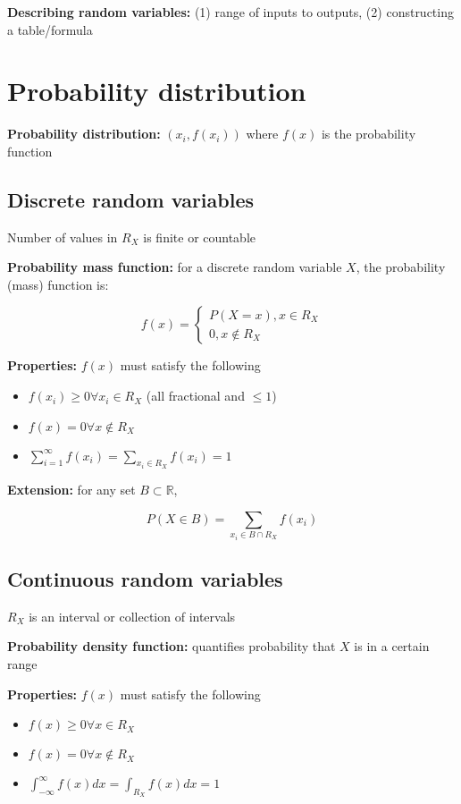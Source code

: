 \documentclass[twocolumn, 8pt]{extarticle}
\begin{document}
\textbf{Describing random variables:} (1) range of inputs to outputs, (2) constructing a table/formula

\section*{Probability distribution}

\textbf{Probability distribution:} $(x_i, f(x_i))$ where $f(x)$ is the probability function
\subsection*{Discrete random variables}

Number of values in $R_X$ is finite or countable

\textbf{Probability mass function:} for a discrete random variable $X$, the probability (mass) function is:

$$
f(x) = \begin{cases}
P(X = x), x \in R_X\\
0, x \not\in R_X
\end{cases}
$$

\textbf{Properties:} $f(x)$ must satisfy the following 

\begin{itemize}
    \item $f(x_i) \geq 0 \forall x_i \in R_X$ (all fractional and $\leq 1$)
    \item $f(x) = 0 \forall x \not\in R_X$
    \item $\sum_{i=1}^{\infty}f(x_i) = \sum_{x_i \in R_X}f(x_i) = 1$
\end{itemize}

\textbf{Extension:} for any set $B \subset \mathbb{R}$,

$$
P(X \in B) = \sum_{x_i \in B \cap R_X} f(x_i)
$$

\subsection*{Continuous random variables}

$R_X$ is an interval or collection of intervals

\textbf{Probability density function:} quantifies probability that $X$ is in a certain range

\textbf{Properties:} $f(x)$ must satisfy the following

\begin{itemize}
    \item $f(x) \geq 0 \forall x \in R_X$
    \item $f(x) = 0 \forall x \not\in R_X$
    \item $\int_{-\infty}^{\infty}f(x) dx = \int_{R_X} f(x) dx = 1$
\end{itemize}
\end{document}
